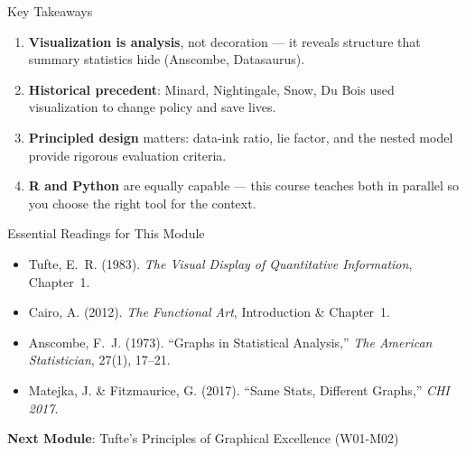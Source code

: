 \documentclass[10pt]{beamer}
\begin{document}
\begin{frame}{Key Takeaways}
  \begin{enumerate}
    \item \textbf{Visualization is analysis}, not decoration --- it reveals
          structure that summary statistics hide (Anscombe, Datasaurus).
    \item \textbf{Historical precedent}: Minard, Nightingale, Snow, Du Bois
          used visualization to change policy and save lives.
    \item \textbf{Principled design} matters: data-ink ratio, lie factor,
          and the nested model provide rigorous evaluation criteria.
    \item \textbf{R and Python} are equally capable --- this course teaches
          both in parallel so you choose the right tool for the context.
  \end{enumerate}
\end{frame}

\begin{frame}{Essential Readings for This Module}
  \begin{itemize}
    \item Tufte, E.~R. (1983). \emph{The Visual Display of Quantitative
          Information}, Chapter~1.
    \item Cairo, A. (2012). \emph{The Functional Art}, Introduction \&
          Chapter~1.
    \item Anscombe, F.~J. (1973). ``Graphs in Statistical Analysis,''
          \emph{The American Statistician}, 27(1), 17--21.
    \item Matejka, J. \& Fitzmaurice, G. (2017). ``Same Stats, Different
          Graphs,'' \emph{CHI 2017}.
  \end{itemize}

  \vspace{6pt}
  \textbf{Next Module}: Tufte's Principles of Graphical Excellence (W01-M02)
\end{frame}
\end{document}
